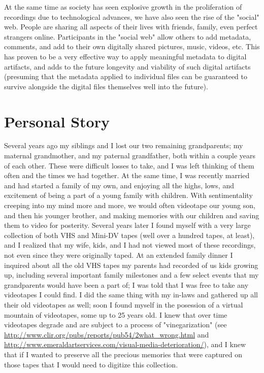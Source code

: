 At the same time as society has seen explosive growth in the proliferation of recordings due to technological advances, we have also seen the rise of the "social" web.  People are sharing all aspects of their lives with friends, family, even perfect strangers online.  Participants in the "social web" allow others to add metadata, comments, and add to their own digitally shared pictures, music, videos, etc.  This has proven to be a very effective way to apply meaningful metadata to digital artifacts, and adds to the future longevity and viability of such digital artifacts (presuming that the metadata applied to individual files can be guaranteed to survive alongside the digital files themselves well into the future).




\section{Personal Story}
\label{sec:problem-statement:personal-story}

Several years ago my siblings and I lost our two remaining grandparents; my maternal grandmother, and my paternal grandfather, both within a couple years of each other.  These were difficult losses to take, and I was left thinking of them often and the times we had together.  At the same time, I was recently married and had started a family of my own, and enjoying all the highs, lows, and excitement of being a part of a young family with children.  With sentimentality creeping into my mind more and more, we would often videotape our young son, and then his younger brother, and making memories with our children and saving them to video for posterity.  Several years later I found myself with a very large collection of both VHS and Mini-DV tapes (well over a hundred tapes, at least), and I realized that my wife, kids, and I had not viewed most of these recordings, not even since they were originally taped.  At an extended family dinner I inquired about all the old VHS tapes my parents had recorded of us kids growing up, including several important family milestones and a few select events that my grandparents would have been a part of; I was told that I was free to take any videotapes I could find.  I did the same thing with my in-laws and gathered up all their old videotapes as well; soon I found myself in the posession of a virtual mountain of videotapes, some up to 25 years old.  I knew that over time videotapes degrade and are subject to a process of "vinegarization" (see \url{http://www.clir.org/pubs/reports/pub54/2what_wrong.html} and \url{http://www.emeraldartservices.com/visual-media-deterioration/}), and I knew that if I wanted to preserve all the precious memories that were captured on those tapes that I would need to digitize this collection.

